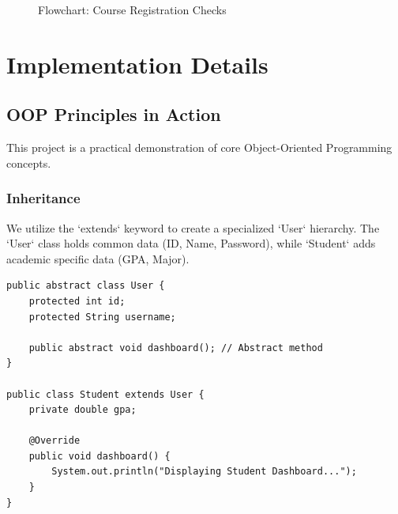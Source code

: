 \documentclass[12pt, a4paper]{report}
\begin{document}
\begin{figure}[H]
    \centering
    \caption{Flowchart: Course Registration Checks}
    \label{fig:flow_reg}
\end{figure}

\chapter{Implementation Details}

\section{OOP Principles in Action}
This project is a practical demonstration of core Object-Oriented Programming concepts.

\subsection{Inheritance}
We utilize the `extends` keyword to create a specialized `User` hierarchy. The `User` class holds common data (ID, Name, Password), while `Student` adds academic specific data (GPA, Major).

\begin{lstlisting}[caption={Inheritance Implementation}]
public abstract class User {
    protected int id;
    protected String username;
    
    public abstract void dashboard(); // Abstract method
}

public class Student extends User {
    private double gpa;
    
    @Override
    public void dashboard() {
        System.out.println("Displaying Student Dashboard...");
    }
}
\end{lstlisting}
\end{document}
